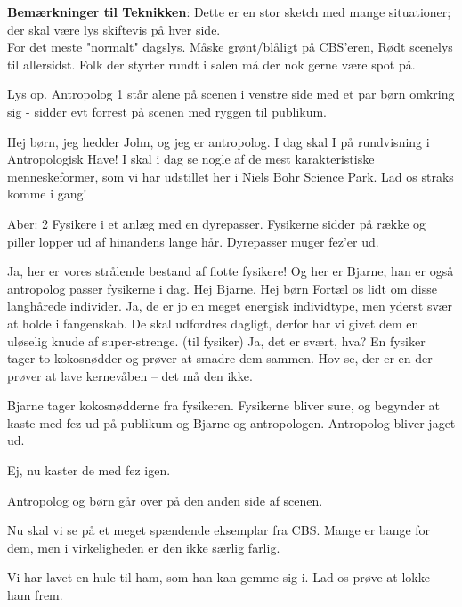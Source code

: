 \documentclass[a4paper,12pt]{article}
\begin{document}
\begin{sketch}

\textbf{Bemærkninger til Teknikken}: Dette er en stor sketch med mange situationer; der skal være lys skiftevis på hver side.\\ For det meste "normalt" dagslys. Måske grønt/blåligt på CBS'eren, Rødt scenelys til allersidst. Folk der styrter rundt i salen må der nok gerne være spot på.

\scene Lys op. Antropolog 1 står alene på scenen i venstre side med et par børn omkring sig - sidder evt forrest på scenen med ryggen til publikum.

 Hej børn, jeg hedder John, og jeg er antropolog. I dag skal I på rundvisning i Antropologisk Have! I skal i dag se nogle af de mest karakteristiske menneskeformer, som vi har udstillet her i Niels Bohr Science Park. Lad os straks komme i gang!\\



\scene Aber: 2 Fysikere i et anlæg med en dyrepasser. Fysikerne sidder på række og piller lopper ud af hinandens lange hår. Dyrepasser muger fez'er ud.

 Ja, her er vores strålende bestand af flotte fysikere! Og her er Bjarne, han er også antropolog passer fysikerne i dag. Hej Bjarne.
 Hej børn
Fortæl os lidt om disse langhårede individer.
Ja, de er jo en meget energisk individtype, men yderst svær at holde i fangenskab. De skal udfordres dagligt, derfor har vi givet dem en uløselig knude af super-strenge. (til fysiker) Ja, det er svært, hva?
\scene En fysiker tager to kokosnødder og prøver at smadre dem sammen.
Hov se, der er en der prøver at lave kernevåben -- det må den ikke.

\scene Bjarne tager kokosnødderne fra fysikeren. Fysikerne bliver sure, og begynder at kaste med fez ud på publikum og Bjarne og antropologen. Antropolog bliver jaget ud.

Ej, nu kaster de med fez igen.

\scene Antropolog og børn går over på den anden side af scenen.

 Nu skal vi se på et meget spændende eksemplar fra CBS. Mange er bange for dem, men i virkeligheden er den ikke særlig farlig.

Vi har lavet en hule til ham, som han kan gemme sig i. Lad os prøve at lokke ham frem.


\end{sketch}
\end{document}
